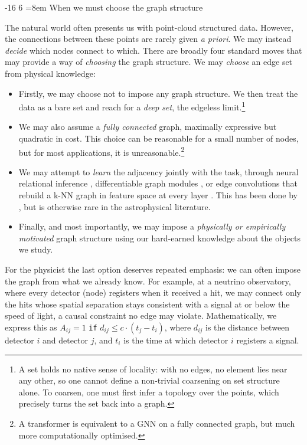 \documentclass[graybox, envcountchap]{Template/svmult}
\makeatletter
\renewcommand\subsubsection{\@startsection{subsubsection}{3}{\z@}%
                       {-16\p@}%
                       {6\p@}%
                       {\normalfont\normalsize\subsubsecstyle
                        \rightskip=\z@ \@plus 8em\pretolerance=10000 }}
\makeatother
\begin{document}
\subsubsection{When we must choose the graph structure}
\label{subsubsec:graph-chosen}

The natural world often presents us with point-cloud structured data. However, the connections between these points are rarely given \textit{a priori}. We may instead \textit{decide} which nodes connect to which. There are broadly four standard moves that may provide a way of \textit{choosing} the graph structure. We may \emph{choose} an edge set from physical knowledge:
\begin{itemize}
    \item Firstly, we may choose not to impose any graph structure. We then treat the data as a bare set and reach for a \emph{deep set}, the edgeless limit.\footnote{A set holds no native sense of locality: with no edges, no element lies near any other, so one cannot define a non-trivial coarsening on set structure alone. To coarsen, one must first infer a topology over the points, which precisely turns the set back into a graph.}
    \item We may also assume a \emph{fully connected} graph, maximally expressive but quadratic in cost. This choice can be reasonable for a small number of nodes, but for most applications, it is unreasonable.\footnote{A transformer is equivalent to a GNN on a fully connected graph, but much more computationally optimised.}
    \item We may attempt to \emph{learn} the adjacency jointly with the task, through neural relational inference \citep{Kipf2018_neural_relational_inference_GNN}, differentiable graph modules \citep{Kazi2023_DifferentiableGraphStructure}, or edge convolutions that rebuild a k-NN graph in feature space at every layer \citep{Wang2019_EdgeConv}. This has been done by \citet{Orsoe2025_graphnet2_library}, but is otherwise rare in the astrophysical literature.
    \item Finally, and most importantly, we may impose a \textit{physically or empirically motivated} graph structure using our hard-earned knowledge about the objects we study.
\end{itemize}

For the physicist the last option deserves repeated emphasis: we can often impose the graph from what we already know. For example, at a neutrino observatory, where every detector (node) registers when it received a hit, we may connect only the hits whose spatial separation stays consistent with a signal at or below the speed of light, a causal constraint no edge may violate. Mathematically, we express this as $A_{ij} = 1$ \texttt{if} $d_{ij} \leq c \cdot (t_j-t_i)$, where $d_{ij}$ is the distance between detector $i$ and detector $j$, and $t_i$ is the time at which detector $i$ registers a signal. 
\end{document}
